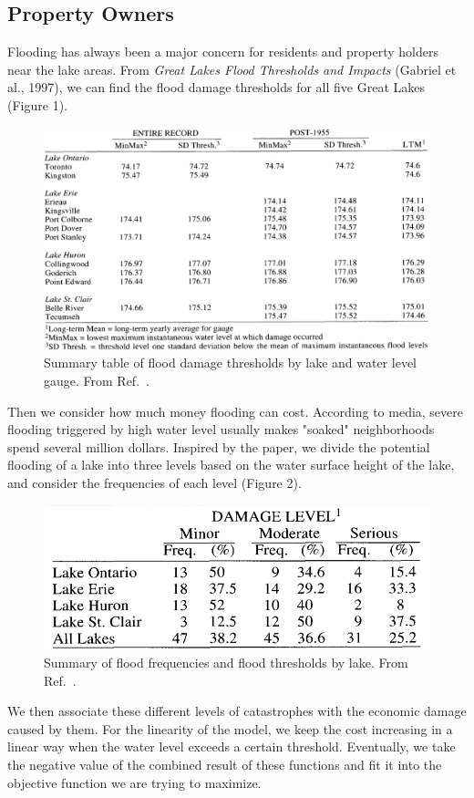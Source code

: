\documentclass[pre,12pt]{revtex4-1}
\begin{document}
\subsection{Property Owners}
Flooding has always been a major concern for residents and property holders near the lake areas. From \textit{Great Lakes Flood Thresholds and Impacts} (Gabriel et al., 1997), we can find the flood damage thresholds for all five Great Lakes (Figure 1).  \par
\begin{figure}[htbp]
\begin{center}
\includegraphics[width=4.5in]{flood.png}
\caption{Summary table of flood damage thresholds by lake and water level gauge. From Ref.~\cite{nd97}.}
\label{leaf}
\end{center}
\end{figure}
Then we consider how much money flooding can cost. According to media, severe flooding triggered by high water level usually makes "soaked" neighborhoods spend several million dollars. Inspired by the paper, we divide the potential flooding of a lake into three levels based on the water surface height of the lake, and consider the frequencies of each level (Figure 2). 
\begin{figure}[htbp]
\begin{center}
\includegraphics[width=4.5in]{floodfreq.png}
\caption{Summary of flood frequencies and flood thresholds by lake. From Ref.~\cite{nd97}.}
\label{leaf}
\end{center}
\end{figure}
We then associate these different levels of catastrophes with the economic damage caused by them. For the linearity of the model, we keep the cost increasing in a linear way when the water level exceeds a certain threshold. Eventually, we take the negative value of the combined result of these functions and fit it into the objective function we are trying to maximize.
\end{document}
